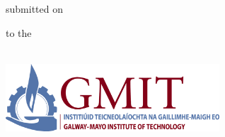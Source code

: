 \begin{titlingpage}
  \vspace{2mm}

  \begin{center}
    \begin{minipage}[t]{\textwidth}
      \centering
      {\small submitted on} \\
      \thesisdate
    \end{minipage}
  \end{center}

  \vspace{2mm}

  \begin{center}
    \begin{minipage}[t]{\textwidth}
      \centering
      {\small to the} \\
      \thesisdepartment \\
      \thesisinstitute
    \end{minipage}
  \end{center}

  \vspace{8mm}

  \begin{center}
    \begin{minipage}[t][30mm]{\textwidth}
      \centering
      \includegraphics[width=80mm]{img/gmit-logo.jpg} \\[4mm]
    \end{minipage}
  \end{center}

\end{titlingpage}